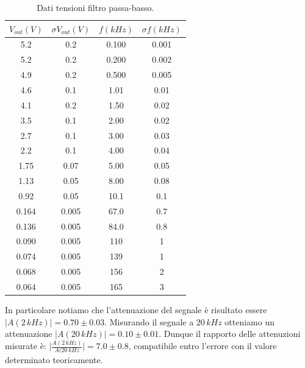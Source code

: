 \documentclass[10pt,a4paper]{article}
\begin{document}
\begin{table}[h]
\centering
\begin{tabular}{|c|c|c|c|}
\hline 
$V_{out} (V)$  &  $\sigma V_{out} (V)$ &  $f(kHz)$ & $\sigma f(kHz)$ \\ 
\hline 
5.2 & 0.2 & 0.100 & 0.001 \\ 
\hline 
5.2 & 0.2 & 0.200 & 0.002 \\ 
\hline 
4.9 & 0.2 & 0.500 & 0.005 \\ 
\hline 
4.6 & 0.1 & 1.01 & 0.01 \\ 
\hline 
4.1 & 0.2 & 1.50 & 0.02 \\ 
\hline 
3.5 & 0.1 & 2.00 & 0.02 \\ 
\hline 
2.7 & 0.1 & 3.00 & 0.03 \\ 
\hline 
2.2 & 0.1 & 4.00 & 0.04 \\ 
\hline 
1.75 & 0.07 & 5.00 & 0.05 \\ 
\hline 
1.13 & 0.05 & 8.00 & 0.08 \\ 
\hline 
0.92 & 0.05 & 10.1 & 0.1 \\ 
\hline 
0.164 & 0.005 & 67.0 & 0.7 \\ 
\hline 
0.136 & 0.005 & 84.0 & 0.8 \\ 
\hline 
0.090 & 0.005 & 110 & 1 \\ 
\hline 
0.074 & 0.005 & 139 & 1 \\ 
\hline 
0.068 & 0.005 & 156 & 2 \\ 
\hline 
0.064 & 0.005 & 165 & 3 \\ 
\hline 
\end{tabular} 
\caption{Dati tensioni filtro passa-basso.}
\end{table}

In particolare notiamo che l'attenuazione del segnale è risultato essere $\vert A(2\,kHz) \vert = 0.70 \pm 0.03$. 
Misurando il segnale a $20\,kHz$ otteniamo un attenuazione $\vert A(20\,kHz) \vert = 0.10 \pm 0.01$. Dunque il rapporto delle attenuzioni misurate è: $\vert \frac{A(2\,kHz)}{A(20\,kHz} \vert = 7.0 \pm 0.8$, compatibile entro l'errore con il valore determinato teoricamente.
\end{document}
